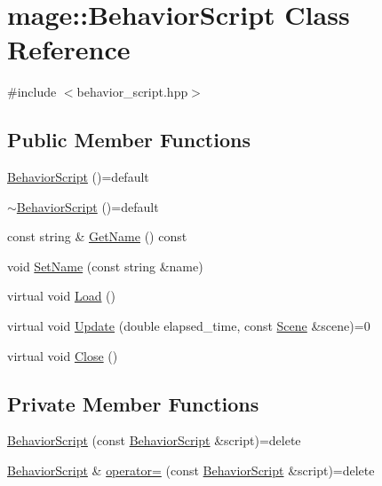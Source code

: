 \hypertarget{classmage_1_1_behavior_script}{}\section{mage\+:\+:Behavior\+Script Class Reference}
\label{classmage_1_1_behavior_script}


{\ttfamily \#include $<$behavior\+\_\+script.\+hpp$>$}

\subsection*{Public Member Functions}
\begin{DoxyCompactItemize}
\item 
\hyperlink{classmage_1_1_behavior_script_a90ac6d3397f54ad95a931c9ef2c47549}{Behavior\+Script} ()=default
\item 
\hyperlink{classmage_1_1_behavior_script_a1cc4b4f909124615af4f49f2327c233e}{$\sim$\+Behavior\+Script} ()=default
\item 
const string \& \hyperlink{classmage_1_1_behavior_script_a06179af26e24991b5083a5b1d603bc93}{Get\+Name} () const
\item 
void \hyperlink{classmage_1_1_behavior_script_a04d2a39a204b9314b1f4b01ad3a93021}{Set\+Name} (const string \&name)
\item 
virtual void \hyperlink{classmage_1_1_behavior_script_a9b2954891ee98dcef926b1db42674ce3}{Load} ()
\item 
virtual void \hyperlink{classmage_1_1_behavior_script_ac5dcb11634d0d37957d3fe91ee4b1524}{Update} (double elapsed\+\_\+time, const \hyperlink{classmage_1_1_scene}{Scene} \&scene)=0
\item 
virtual void \hyperlink{classmage_1_1_behavior_script_a58397c708ec04ca09983bb20cfc0afbe}{Close} ()
\end{DoxyCompactItemize}
\subsection*{Private Member Functions}
\begin{DoxyCompactItemize}
\item 
\hyperlink{classmage_1_1_behavior_script_a776701dc960610d3a08679bc01e1def5}{Behavior\+Script} (const \hyperlink{classmage_1_1_behavior_script}{Behavior\+Script} \&script)=delete
\item 
\hyperlink{classmage_1_1_behavior_script}{Behavior\+Script} \& \hyperlink{classmage_1_1_behavior_script_a0b3327ebf7009e668a7022d254cb1d51}{operator=} (const \hyperlink{classmage_1_1_behavior_script}{Behavior\+Script} \&script)=delete
\end{DoxyCompactItemize}
